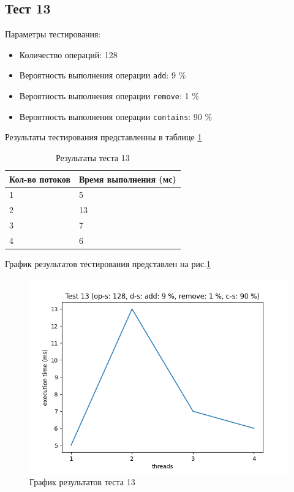 \subsection*{Тест 13}

Параметры тестирования:

\begin{itemize}
    \item Количество операций: 128
    \item Вероятность выполнения операции \verb|add|: 9 \%
    \item Вероятность выполнения операции \verb|remove|: 1 \%
    \item Вероятность выполнения операции \verb|contains|: 90 \%
\end{itemize}

Результаты тестирования представленны в таблице \ref{tab:results13}


\begin{table}[H]
    \centering
    \begin{tabular}{|l|l|}
        \hline
        Кол-во потоков & Время выполнения (мс) \\
        \hline
        1 & 5 \\
        \hline
        2 & 13 \\
        \hline
        3 & 7 \\
        \hline
        4 & 6 \\
        \hline
    \end{tabular}
    \caption{Результаты теста 13}
    \label{tab:results13}
\end{table}
        

График результатов тестирования представлен на рис.\ref{fig:plot13}

\begin{figure}[H]
    \centering
    \includegraphics[width=0.7\linewidth]{photo/plot13}
    \caption{График результатов теста 13}
    \label{fig:plot13}
\end{figure}

